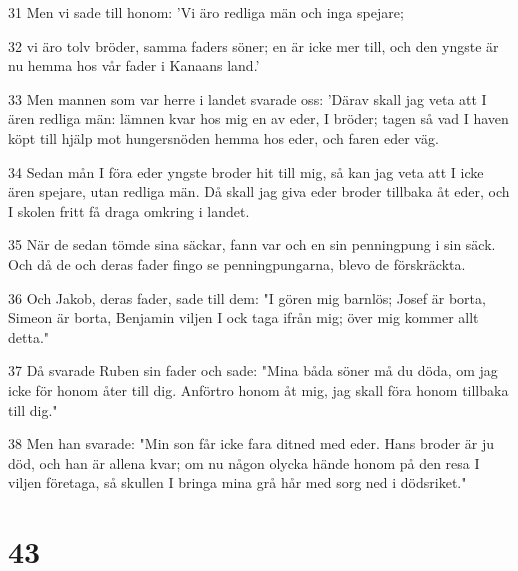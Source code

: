\par 31 Men vi sade till honom: 'Vi äro redliga män och inga spejare;
\par 32 vi äro tolv bröder, samma faders söner; en är icke mer till, och den yngste är nu hemma hos vår fader i Kanaans land.'
\par 33 Men mannen som var herre i landet svarade oss: 'Därav skall jag veta att I ären redliga män: lämnen kvar hos mig en av eder, I bröder; tagen så vad I haven köpt till hjälp mot hungersnöden hemma hos eder, och faren eder väg.
\par 34 Sedan mån I föra eder yngste broder hit till mig, så kan jag veta att I icke ären spejare, utan redliga män. Då skall jag giva eder broder tillbaka åt eder, och I skolen fritt få draga omkring i landet.
\par 35 När de sedan tömde sina säckar, fann var och en sin penningpung i sin säck. Och då de och deras fader fingo se penningpungarna, blevo de förskräckta.
\par 36 Och Jakob, deras fader, sade till dem: "I gören mig barnlös; Josef är borta, Simeon är borta, Benjamin viljen I ock taga ifrån mig; över mig kommer allt detta."
\par 37 Då svarade Ruben sin fader och sade: "Mina båda söner må du döda, om jag icke för honom åter till dig. Anförtro honom åt mig, jag skall föra honom tillbaka till dig."
\par 38 Men han svarade: "Min son får icke fara ditned med eder. Hans broder är ju död, och han är allena kvar; om nu någon olycka hände honom på den resa I viljen företaga, så skullen I bringa mina grå hår med sorg ned i dödsriket."

\chapter{43}

